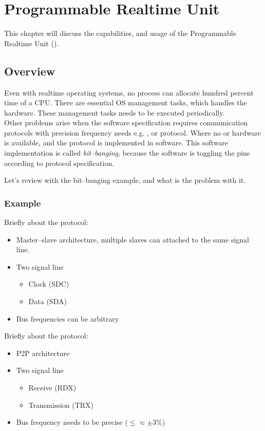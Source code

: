 \chapter{Programmable Realtime Unit}
\label{chap:pru}

This chapter will discuss the capabilities, and usage of the Programmable Realtime Unit ().

\section{Overview}

Even with realtime operating systems, no process can allocate hundred percent time of a CPU. There are essential OS management tasks, which handles the hardware. These management tasks needs to be executed periodically.
\\[1ex]
Other problems arise when the software specification requires communication protocols with precision frequency needs e.g. \isc, or \uart protocol. Where no \isc or \uart hardware is available, and the protocol is implemented in software. This software implementation is called \emph{bit--banging}, because the software is toggling the \gpio pins according to protocol specification.

Let's review with the \isc bit--banging example, and what is the problem with it.

\subsection{Example}

Briefly about the \isc protocol:
\begin{itemize}
	\item Master--slave architecture, multiple slaves can attached to the same signal line.
	\item Two signal line
	\begin{itemize}
		\item Clock (SDC)
		\item Data (SDA)
	\end{itemize}
	\item Bus frequencies can be arbitrary
\end{itemize}

\noindent\begin{minipage}{\textwidth}
	Briefly about the \uart protocol:
	\begin{itemize}
		\item P2P architecture
		\item Two signal line
		\begin{itemize}
			\item Receive (RDX)
			\item Transmission (TRX)
		\end{itemize}
		\item Bus frequency needs to be precise ($\le\approx\pm3\%$)
	\end{itemize}
\end{minipage}

